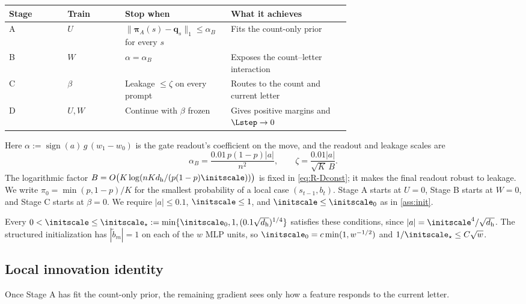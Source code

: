 \begin{center}
\small
\begin{tabular}{@{}llp{0.31\linewidth}p{0.35\linewidth}@{}}
\toprule
Stage & Train & Stop when & What it achieves \\
\midrule
A & $U$ & $\|\bm\pi_A(s)-\bm q_s\|_1\le\alpha_B$ for every $s$ & Fits the count-only prior \\[1mm]
B & $W$ & $\alpha=\alpha_B$ & Exposes the count--letter interaction \\[1mm]
C & $\beta$ & Leakage $\le\zeta$ on every prompt & Routes to the count and current letter \\[1mm]
D & $U,W$ & Continue with $\beta$ frozen & Gives positive margins and $\Lstep\to0$ \\
\bottomrule
\end{tabular}
\end{center}
Here $\alpha:=\operatorname{sign}(a)\,g\,(w_1-w_0)$ is the gate readout's coefficient on the move, and the readout and leakage scales are
\[
 \alpha_B=\frac{0.01\,p(1-p)|a|}{n^2},\qquad \zeta=\frac{0.01|a|}{\sqrt K\,B}.
\]
The logarithmic factor $B=O\bigl(K\log(nKd_{\mathrm h}/(p(1-p)\initscale))\bigr)$ is fixed in \cref{eq:R-Dconst}; it makes the final
readout robust to leakage. We write $\pi_0=\min(p,1-p)/K$ for the smallest probability of a local case $(s_{t-1},b_t)$.
Stage A starts at $U=0$, Stage B starts at $W=0$, and Stage C starts at $\beta=0$.
We require $|a|\le0.1$, $\initscale\le1$, and $\initscale\le\initscale_0$ as in \cref{ass:init}.

\label{lem:R-scale}
Every $0<\initscale\le\initscale_\star:=\min\{\initscale_0,1,(0.1\sqrt{d_{\mathrm h}})^{1/4}\}$ satisfies these
conditions, since $|a|=\initscale^4/\sqrt{d_{\mathrm h}}$. The structured initialization has $|\tilde b_m|=1$ on each of the $w$ MLP
units, so $\initscale_0=c\min(1,w^{-1/2})$ and $1/\initscale_\star\le C\sqrt w$.

\subsection{Local innovation identity}
Once Stage A has fit the count-only prior, the remaining gradient sees only how a feature responds to the current letter.

